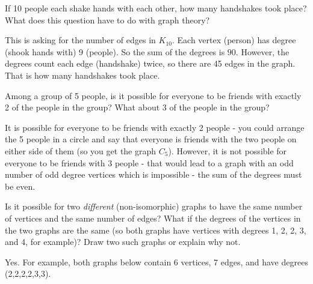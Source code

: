 \begin{questions}
\question If 10 people each shake hands with each other, how many handshakes took place?  What does this question have to do with graph theory?

	\begin{answer}
		This is asking for the number of edges in $K_{10}$.  Each vertex (person) has degree (shook hands with) 9 (people).  So the sum of the degrees is $90$.  However, the degrees count each edge (handshake) twice, so there are 45 edges in the graph.  That is how many handshakes took place.%
	\end{answer}
	
	
	

\question Among a group of 5 people, is it possible for everyone to be friends with exactly 2 of the people in the group?  What about 3 of the people in the group?

	\begin{answer}
		It is possible for everyone to be friends with exactly 2 people - you could arrange the 5 people in a circle and say that everyone is friends with the two people on either side of them (so you get the graph $C_5$).  However, it is not possible for everyone to be friends with 3 people - that would lead to a graph with an odd number of odd degree vertices which is impossible - the sum of the degrees must be even.  %
	\end{answer}
	
	



\question Is it possible for two {\em different} (non-isomorphic) graphs to have the same number of vertices and the same number of edges?  What if the degrees of the vertices in the two graphs are the same (so both graphs have vertices with degrees 1, 2, 2, 3, and 4, for example)?  Draw two such graphs or explain why not.

	\begin{answer}
		Yes.  For example, both graphs below contain 6 vertices, 7 edges, and have degrees (2,2,2,2,3,3).
		\begin{center}
		  \hfill
		  \hfill
		  \hfill ~
		\end{center}
	\end{answer}
	

\end{questions}
